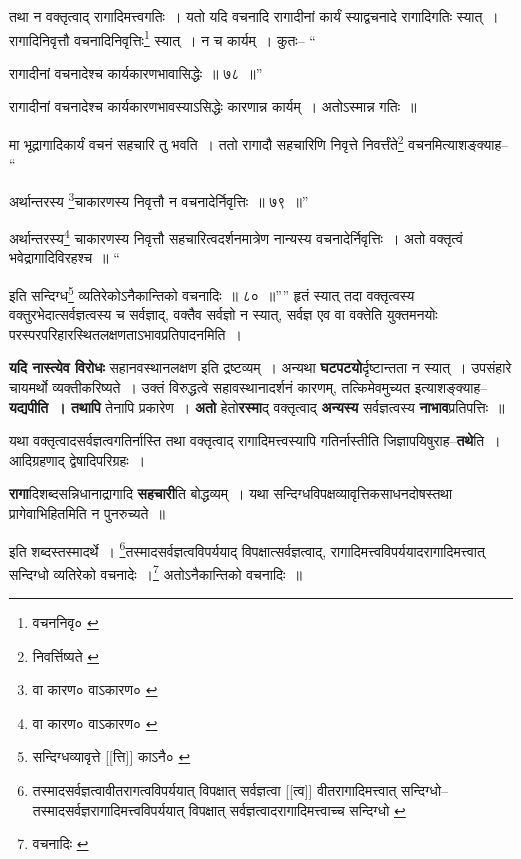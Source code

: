 \documentclass[article,12pt,a4paper]{memoir}
\begin{document}
	तथा न वक्तृत्वाद् रागादिमत्त्वगतिः । यतो यदि वचनादि रागादीनां कार्यं स्याद्वचनादे रागादिगतिः स्यात् । रागादिनिवृत्तौ वचनादिनिवृत्तिः\footnote{वचननिवृ० \cite{dp-msB} \cite{dp-msC} \cite{dp-msD}} स्यात् । न च कार्यम् । कुतः-- “
	  
	रागादीनां वचनादेश्च कार्यकारणभावासिद्धेः ॥ ७८ ॥” 
	  
	रागादीनां वचनादेश्च कार्यकारणभावस्याऽसिद्धेः कारणान्न कार्यम् । अतोऽस्मान्न गतिः ॥ 
	  
	मा भूद्रागादिकार्यं वचनं सहचारि तु भवति । ततो रागादौ सहचारिणि निवृत्ते निवर्त्तंते\footnote{निवर्त्तिष्यते \cite{dp-msC}} वचनमित्याशङ्क्याह-- “
	  
	अर्थान्तरस्य \footnote{वा कारण० \cite{dp-msA} \cite{dp-msB} \cite{dp-edP} \cite{dp-edH} \cite{dp-edE} वाऽकारण० \cite{dp-edN}}चाकारणस्य निवृत्तौ न वचनादेर्निवृत्तिः ॥ ७९ ॥” 
	  
	अर्थान्तरस्य\footnote{वा कारण० \cite{dp-msA} \cite{dp-msB} \cite{dp-edP} \cite{dp-edH} \cite{dp-edE} वाऽकारण० \cite{dp-edN}} चाकारणस्य निवृत्तौ सहचारित्वदर्शनमात्रेण नान्यस्य वचनादेर्निवृत्तिः । अतो वक्तृत्वं भवेद्रागादिविरहश्च ॥ “
	  
	इति सन्दिग्ध\footnote{सन्दिग्धव्यावृत्ते [[त्ति]] काऽनै० \cite{dp-msC}} व्यतिरेकोऽनैकान्तिको वचनादिः ॥ ८० ॥”” हृतं स्यात् तदा वक्तृत्वस्य वक्तुरभेदात्सर्वज्ञत्वस्य च सर्वज्ञाद्, वक्तैव सर्वज्ञो न स्यात्, सर्वज्ञ एव वा वक्तेति युक्तमनयोः परस्परपरिहारस्थितलक्षणताऽभावप्रतिपादनमिति ।
	\pend
      

	  \pstart \textbf{यदि नास्त्येव विरोधः} सहानवस्थानलक्षण इति द्रष्टव्यम् । अन्यथा \textbf{घटपटयो}र्दृष्टान्तता न स्यात् । उपसंहारे चायमर्थो व्यक्तीकरिष्यते । उक्तं विरुद्धत्वे सहावस्थानादर्शनं कारणम्, तत्किमेवमुच्यत इत्याशङ्क्याह--\textbf{यद्यपीति । तथापि} तेनापि प्रकारेण । \textbf{अतो} हेतो\textbf{रस्मा}द् वक्तृत्वाद् \textbf{अन्यस्य} सर्वज्ञत्वस्य \textbf{नाभाव}प्रतिपत्तिः ॥
	\pend
      

	  \pstart यथा वक्तृत्वादसर्वज्ञत्वगतिर्नास्ति तथा वक्तृत्वाद् रागादिमत्त्वस्यापि गतिर्नास्तीति जिज्ञापयिषुराह--\textbf{तथे}ति । आदिग्रहणाद् द्वेषादिपरिग्रहः ।
	\pend
      

	  \pstart \textbf{रागा}दिशब्दसन्निधानाद्रागादि \textbf{सहचारी}ति बोद्धव्यम् । यथा सन्दिग्धविपक्षव्यावृत्तिकसाधनदोषस्तथा प्रागेवाभिहितमिति न पुनरुच्यते ॥
	\pend
      \leavevmode{}
	  \bigskip
	  \begingroup
	

	  \pstart इति शब्दस्तस्मादर्थे । \footnote{तस्मादसर्वज्ञत्वावीतरागत्वविपर्ययात् विपक्षात् सर्वज्ञत्वा [[त्व]] वीतरागादिमत्त्वात् सन्दिग्धो--\cite{dp-msB} तस्मादसर्वज्ञरागादिमत्त्वविपर्ययात् विपक्षात् सर्वज्ञत्वादरागादिमत्त्वाच्च सन्दिग्धो \cite{dp-msC}}तस्मादसर्वज्ञत्वविपर्ययाद् विपक्षात्सर्वज्ञत्वाद्, रागादिमत्त्वविपर्ययादरागादिमत्त्वात् सन्दिग्धो व्यतिरेको वचनादेः ।\footnote{वचनादिः \cite{dp-msC}} अतोऽनैकान्तिको वचनादिः ॥
	\pend
       
\end{document}
